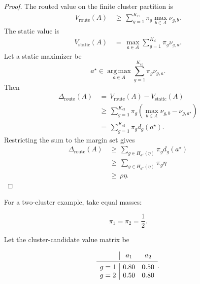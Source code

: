 \documentclass{article} %
\begin{document}
\begin{proof}
The routed value on the finite cluster partition is
\begin{align}
\label{eq:app-fifth-cluster-route}
V_{\mathrm{route}}(A)
&\,\ge\,
\sum_{g=1}^{K_{\mathrm{cl}}}
\pi_g
\max_{b\in A}\nu_{g,b}.
\end{align}
The static value is
\begin{align}
\label{eq:app-fifth-cluster-static}
V_{\mathrm{static}}(A)
&\,=\,
\max_{a\in A}
\sum_{g=1}^{K_{\mathrm{cl}}}\pi_g\nu_{g,a}.
\end{align}
Let a static maximizer be
\begin{equation}
\label{eq:app-fifth-static-maximizer}
a^\star
\in
\operatorname*{arg\,max}_{a\in A}
\sum_{g=1}^{K_{\mathrm{cl}}}\pi_g\nu_{g,a}.
\end{equation}
Then
\begin{align}
\label{eq:app-fifth-margin-proof-delta}
\Delta_{\mathrm{route}}(A)
&\,=\,
V_{\mathrm{route}}(A)-V_{\mathrm{static}}(A)
\\
&\,\ge\,
\sum_{g=1}^{K_{\mathrm{cl}}}
\pi_g
\left(
\max_{b\in A}\nu_{g,b}-\nu_{g,a^\star}
\right)
\\
&\,=\,
\sum_{g=1}^{K_{\mathrm{cl}}}\pi_g d_g(a^\star).
\end{align}
Restricting the sum to the margin set gives
\begin{align}
\label{eq:app-fifth-margin-proof-restrict}
\Delta_{\mathrm{route}}(A)
&\,\ge\,
\sum_{g\in H_{a^\star}(\eta)}
\pi_g d_g(a^\star)
\\
&\,\ge\,
\sum_{g\in H_{a^\star}(\eta)}
\pi_g\eta
\\
&\,\ge\,
\rho\eta.
\end{align}
\end{proof}

For a two-cluster example, take equal masses:

\begin{equation}
\label{eq:app-fifth-margin-example-mass}
\pi_1=\pi_2=\frac{1}{2}.
\end{equation}

Let the cluster-candidate value matrix be

\begin{equation}
\label{eq:app-fifth-margin-example-matrix}
\begin{array}{c|cc}
& a_1 & a_2\\
\midrule
g=1 & 0.80 & 0.50\\
g=2 & 0.50 & 0.80
\end{array}.
\end{equation}
\end{document}
